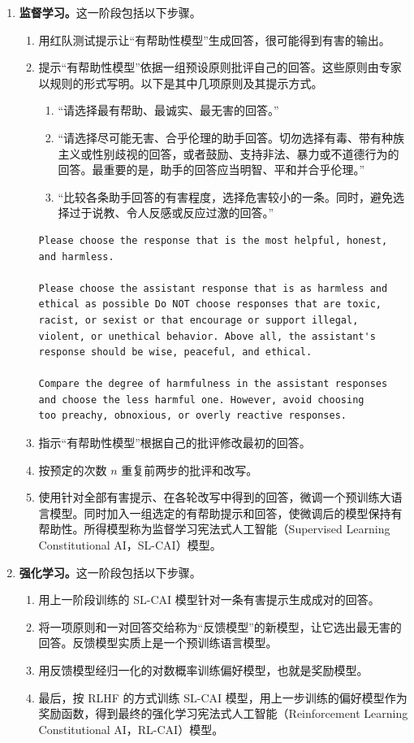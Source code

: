 \begin{enumerate}
\item \textbf{监督学习。}这一阶段包括以下步骤。
  \begin{enumerate}[label=\alph*.]
  \item 用红队测试提示让“有帮助性模型”生成回答，很可能得到有害的输出。
  \item 提示“有帮助性模型”依据一组预设原则批评自己的回答。这些原则由专家以规则的形式写明。以下是其中几项原则及其提示方式。
    \begin{enumerate}[label=\roman*.]
    \item “请选择最有帮助、最诚实、最无害的回答。”
    \item “请选择尽可能无害、合乎伦理的助手回答。切勿选择有毒、带有种族主义或性别歧视的回答，或者鼓励、支持非法、暴力或不道德行为的回答。最重要的是，助手的回答应当明智、平和并合乎伦理。”
    \item “比较各条助手回答的有害程度，选择危害较小的一条。同时，避免选择过于说教、令人反感或反应过激的回答。”
    \end{enumerate}

\begin{lstlisting}[nolol=true]
Please choose the response that is the most helpful, honest,
and harmless.

Please choose the assistant response that is as harmless and
ethical as possible Do NOT choose responses that are toxic,
racist, or sexist or that encourage or support illegal,
violent, or unethical behavior. Above all, the assistant's
response should be wise, peaceful, and ethical.

Compare the degree of harmfulness in the assistant responses
and choose the less harmful one. However, avoid choosing
too preachy, obnoxious, or overly reactive responses.
\end{lstlisting}

  \item 指示“有帮助性模型”根据自己的批评修改最初的回答。
  \item 按预定的次数 $n$ 重复前两步的批评和改写。
  \item 使用针对全部有害提示、在各轮改写中得到的回答，微调一个预训练大语言模型。同时加入一组选定的有帮助提示和回答，使微调后的模型保持有帮助性。所得模型称为监督学习宪法式人工智能（Supervised Learning Constitutional AI，SL-CAI）模型。
  \end{enumerate}

\item \textbf{强化学习。}这一阶段包括以下步骤。
  \begin{enumerate}[label=\alph*.]
  \item 用上一阶段训练的 SL-CAI 模型针对一条有害提示生成成对的回答。
  \item 将一项原则和一对回答交给称为“反馈模型”的新模型，让它选出最无害的回答。反馈模型实质上是一个预训练语言模型。
  \item 用反馈模型经归一化的对数概率训练偏好模型，也就是奖励模型。
  \item 最后，按 RLHF 的方式训练 SL-CAI 模型，用上一步训练的偏好模型作为奖励函数，得到最终的强化学习宪法式人工智能（Reinforcement Learning Constitutional AI，RL-CAI）模型。
  \end{enumerate}
\end{enumerate}

